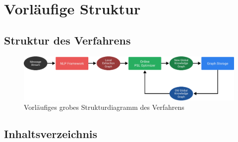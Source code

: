\documentclass[11pt, a4paper]{scrreprt}
\begin{document}
\section{Vorläufige Struktur}

\subsection{Struktur des Verfahrens}

\begin{figure}[h]
	\centering
	\includegraphics[width=\linewidth]{assets/overview}
	\caption{Vorläufiges grobes Strukturdiagramm des Verfahrens}\label{fig:overview}
\end{figure}

\subsection{Inhaltsverzeichnis}
\end{document}
